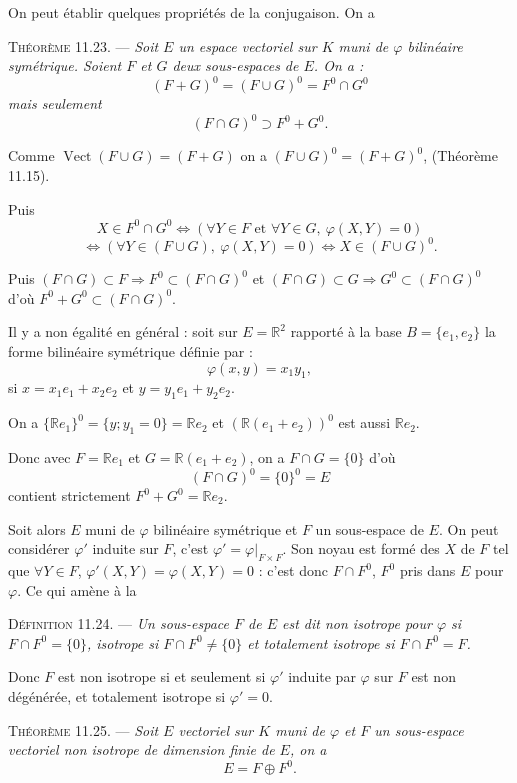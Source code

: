 On peut établir quelques propriétés de la conjugaison. On a

\medskip\noindent\textsc{Théorème 11.23.} --- \emph{Soit $E$ un espace vectoriel sur $K$ muni de $\varphi$ bilinéaire symétrique. Soient $F$ et $G$ deux sous-espaces de $E$. On a :
\[
(F+G)^0=(F\cup G)^0=F^0\cap G^0
\]
mais seulement
\[
(F\cap G)^0\supset F^0+G^0.
\]}

Comme $\operatorname{Vect}(F\cup G)=(F+G)$ on a $(F\cup G)^0=(F+G)^0$, (Théorème 11.15).

Puis
\[
X\in F^0\cap G^0\Longleftrightarrow(\forall Y\in F\text{ et }\forall Y\in G,\ \varphi(X,Y)=0)
\]
\[
\Longleftrightarrow(\forall Y\in(F\cup G),\ \varphi(X,Y)=0)
\Longleftrightarrow X\in(F\cup G)^0.
\]

Puis $(F\cap G)\subset F\Rightarrow F^0\subset(F\cap G)^0$ et $(F\cap G)\subset G\Rightarrow G^0\subset(F\cap G)^0$ d'où $F^0+G^0\subset(F\cap G)^0$. \bookend

Il y a non égalité en général : soit sur $E=\mathbb R^2$ rapporté à la base $B=\{e_1,e_2\}$ la forme bilinéaire symétrique définie par :
\[
\varphi(x,y)=x_1y_1,
\]
si $x=x_1e_1+x_2e_2$ et $y=y_1e_1+y_2e_2$.

On a $\{\mathbb Re_1\}^0=\{y;y_1=0\}=\mathbb Re_2$ et $(\mathbb R(e_1+e_2))^0$ est aussi $\mathbb Re_2$.

Donc avec $F=\mathbb Re_1$ et $G=\mathbb R(e_1+e_2)$, on a $F\cap G=\{0\}$ d'où
\[
(F\cap G)^0=\{0\}^0=E
\]
contient strictement $F^0+G^0=\mathbb Re_2$.

Soit alors $E$ muni de $\varphi$ bilinéaire symétrique et $F$ un sous-espace de $E$. On peut considérer $\varphi'$ induite sur $F$, c'est $\varphi'=\varphi|_{F\times F}$. Son noyau est formé des $X$ de $F$ tel que $\forall Y\in F$, $\varphi'(X,Y)=\varphi(X,Y)=0$ : c'est donc $F\cap F^0$, $F^0$ pris dans $E$ pour $\varphi$. Ce qui amène à la

\medskip\noindent\textsc{Définition 11.24.} --- \emph{Un sous-espace $F$ de $E$ est dit non isotrope pour $\varphi$ si $F\cap F^0=\{0\}$, isotrope si $F\cap F^0\ne\{0\}$ et totalement isotrope si $F\cap F^0=F$.}

Donc $F$ est non isotrope si et seulement si $\varphi'$ induite par $\varphi$ sur $F$ est non dégénérée, et totalement isotrope si $\varphi'=0$.

\medskip\noindent\textsc{Théorème 11.25.} --- \emph{Soit $E$ vectoriel sur $K$ muni de $\varphi$ et $F$ un sous-espace vectoriel non isotrope de dimension finie de $E$, on a
\[
E=F\oplus F^0.
\]}

